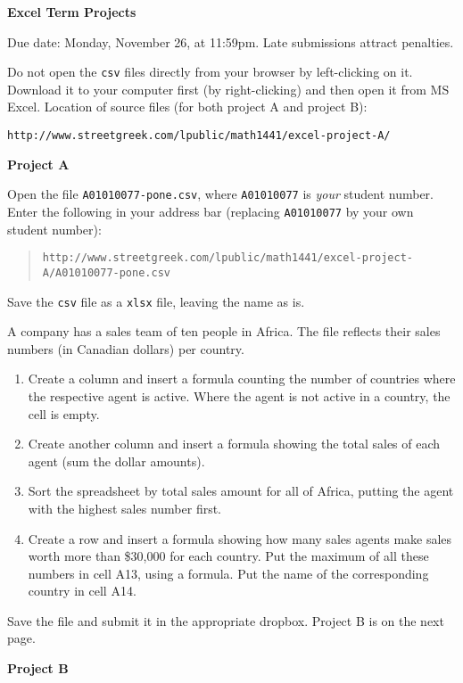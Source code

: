 \documentclass[11pt]{article}
\begin{document}
\textbf{Excel Term Projects}

Due date: Monday, November 26, at 11:59pm. Late submissions attract
penalties.

Do not open the \texttt{csv} files directly from your browser by
left-clicking on it. Download it to your computer first (by
right-clicking) and then open it from MS Excel. Location of source
files (for both project A and project B):

\texttt{http://www.streetgreek.com/lpublic/math1441/excel-project-A/}

\textbf{Project A}

Open the file \texttt{A01010077-pone.csv}, where \texttt{A01010077} is
\emph{your} student number. Enter the following in your address bar
(replacing \texttt{A01010077} by your own student number):

\begin{quote}
  \texttt{http://www.streetgreek.com/lpublic/math1441/excel-project-A/A01010077-pone.csv}
\end{quote}

Save the \texttt{csv} file as a \texttt{xlsx} file, leaving the name
as is.

A company has a sales team of ten people in Africa. The file reflects
their sales numbers (in Canadian dollars) per country.

\begin{enumerate}
\item Create a column and insert a formula counting the number of countries
where the respective agent is active. Where the agent is not active in
a country, the cell is empty.
\item Create another column and insert a formula showing the total sales of
  each agent (sum the dollar amounts).
\item Sort the spreadsheet by total sales amount for all of Africa,
  putting the agent with the highest sales number first.
\item Create a row and insert a formula showing how many sales agents
  make sales worth more than \$30,000 for each country. Put the
  maximum of all these numbers in cell A13, using a formula. Put the
  name of the corresponding country in cell A14.
\end{enumerate}

Save the file and submit it in the appropriate dropbox. Project B is
on the next page.

\newpage

\textbf{Project B}
\end{document}
